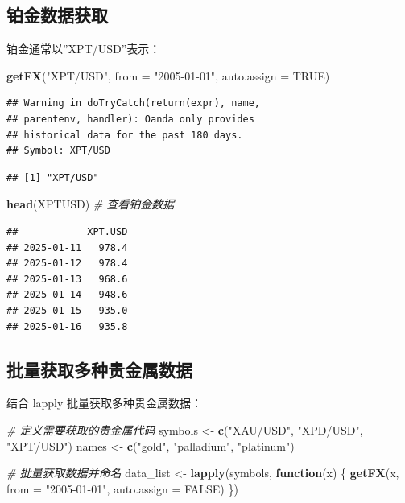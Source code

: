 \documentclass[]{ctexbook}
\newenvironment{Shaded}{\begin{snugshade}}{\end{snugshade}}
\newcommand{\AttributeTok}[1]{\textcolor[rgb]{0.13,0.29,0.53}{#1}}
\newcommand{\CommentTok}[1]{\textcolor[rgb]{0.56,0.35,0.01}{\textit{#1}}}
\newcommand{\ConstantTok}[1]{\textcolor[rgb]{0.56,0.35,0.01}{#1}}
\newcommand{\ControlFlowTok}[1]{\textcolor[rgb]{0.13,0.29,0.53}{\textbf{#1}}}
\newcommand{\FunctionTok}[1]{\textcolor[rgb]{0.13,0.29,0.53}{\textbf{#1}}}
\newcommand{\NormalTok}[1]{#1}
\newcommand{\OtherTok}[1]{\textcolor[rgb]{0.56,0.35,0.01}{#1}}
\newcommand{\StringTok}[1]{\textcolor[rgb]{0.31,0.60,0.02}{#1}}
\begin{document}
\subsection{铂金数据获取}\label{ux94c2ux91d1ux6570ux636eux83b7ux53d6}

铂金通常以''XPT/USD''表示：

\begin{Shaded}
\begin{Highlighting}[]
\FunctionTok{getFX}\NormalTok{(}\StringTok{"XPT/USD"}\NormalTok{, }\AttributeTok{from =} \StringTok{"2005{-}01{-}01"}\NormalTok{, }\AttributeTok{auto.assign =} \ConstantTok{TRUE}\NormalTok{)}
\end{Highlighting}
\end{Shaded}

\begin{verbatim}
## Warning in doTryCatch(return(expr), name,
## parentenv, handler): Oanda only provides
## historical data for the past 180 days.
## Symbol: XPT/USD
\end{verbatim}

\begin{verbatim}
## [1] "XPT/USD"
\end{verbatim}

\begin{Shaded}
\begin{Highlighting}[]
\FunctionTok{head}\NormalTok{(XPTUSD)  }\CommentTok{\# 查看铂金数据}
\end{Highlighting}
\end{Shaded}

\begin{verbatim}
##            XPT.USD
## 2025-01-11   978.4
## 2025-01-12   978.4
## 2025-01-13   968.6
## 2025-01-14   948.6
## 2025-01-15   935.0
## 2025-01-16   935.8
\end{verbatim}

\subsection{批量获取多种贵金属数据}\label{ux6279ux91cfux83b7ux53d6ux591aux79cdux8d35ux91d1ux5c5eux6570ux636e}

结合 lapply 批量获取多种贵金属数据：

\begin{Shaded}
\begin{Highlighting}[]
\CommentTok{\# 定义需要获取的贵金属代码}
\NormalTok{symbols }\OtherTok{\textless{}{-}} \FunctionTok{c}\NormalTok{(}\StringTok{"XAU/USD"}\NormalTok{, }\StringTok{"XPD/USD"}\NormalTok{, }\StringTok{"XPT/USD"}\NormalTok{)}
\NormalTok{names }\OtherTok{\textless{}{-}} \FunctionTok{c}\NormalTok{(}\StringTok{"gold"}\NormalTok{, }\StringTok{"palladium"}\NormalTok{, }\StringTok{"platinum"}\NormalTok{)}

\CommentTok{\# 批量获取数据并命名}
\NormalTok{data\_list }\OtherTok{\textless{}{-}} \FunctionTok{lapply}\NormalTok{(symbols, }\ControlFlowTok{function}\NormalTok{(x) \{}
  \FunctionTok{getFX}\NormalTok{(x, }\AttributeTok{from =} \StringTok{"2005{-}01{-}01"}\NormalTok{, }\AttributeTok{auto.assign =} \ConstantTok{FALSE}\NormalTok{)}
\NormalTok{\})}
\end{Highlighting}
\end{Shaded}
\end{document}
